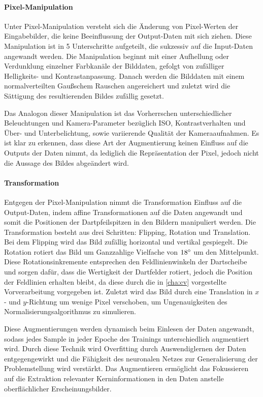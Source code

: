 \paragraph{Pixel-Manipulation}

Unter Pixel-Manipulation versteht sich die Änderung von Pixel-Werten der Eingabebilder, die keine Beeinflussung der Output-Daten mit sich ziehen. Diese Manipulation ist in 5 Unterschritte aufgeteilt, die sukzessiv auf die Input-Daten angewandt werden. Die Manipulation beginnt mit einer Aufhellung oder Verdunklung einzelner Farbkanäle der Bilddaten, gefolgt von zufälliger Helligkeits- und Kontrastanpassung. Danach werden die Bilddaten mit einem normalverteilten Gaußschem Rauschen angereichert und zuletzt wird die Sättigung des resultierenden Bildes zufällig gesetzt.

Das Analogon dieser Manipulation ist das Vorherrschen unterschiedlicher Beleuchtungen und Kamera-Parameter bezüglich ISO, Kontrastverhalten und Über- und Unterbelichtung, sowie variierende Qualität der Kameraaufnahmen. Es ist klar zu erkennen, dass diese Art der Augmentierung keinen Einfluss auf die Outputs der Daten nimmt, da lediglich die Repräsentation der Pixel, jedoch nicht die Aussage des Bildes abgeändert wird.

\paragraph{Transformation}

Entgegen der Pixel-Manipulation nimmt die Transformation Einfluss auf die Output-Daten, indem affine Transformationen auf die Daten angewandt und somit die Positionen der Dartpfeilspitzen in den Bildern manipuliert werden. Die Transformation besteht aus drei Schritten: Flipping, Rotation und Translation. Bei dem Flipping wird das Bild zufällig horizontal und vertikal gespiegelt. Die Rotation rotiert das Bild um Ganzzahlige Vielfache von $18^{\circ}$ um den Mittelpunkt. Diese Rotationsinkremente entsprechen den Feldlinienwinkeln der Dartscheibe und sorgen dafür, dass die Wertigkeit der Dartfelder rotiert, jedoch die Position der Feldlinien erhalten bleibt, da diese durch die in \autoref{cha:cv} vorgestellte Vorverarbeitung vorgegeben ist. Zuletzt wird das Bild durch eine Translation in $x$- und $y$-Richtung um wenige Pixel verschoben, um Ungenauigkeiten des Normalisierungsalgorithmus zu simulieren.

\vspace{\baselineskip}

Diese Augmentierungen werden dynamisch beim Einlesen der Daten angewandt, sodass jedes Sample in jeder Epoche des Trainings unterschiedlich augmentiert wird. Durch diese Technik wird Overfitting durch Auswendiglernen der Daten entgegengewirkt und die Fähigkeit des neuronalen Netzes zur Generalisierung der Problemstellung wird verstärkt. Das Augmentieren ermöglicht das Fokussieren auf die Extraktion relevanter Kerninformationen in den Daten anstelle oberflächlicher Erscheinungsbilder.

